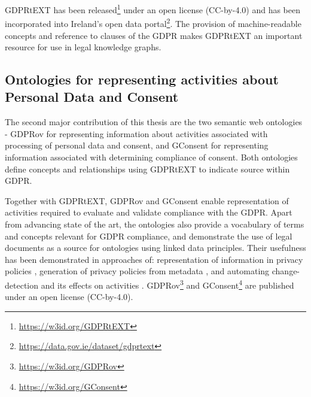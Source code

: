 GDPRtEXT has been released\footnote{\url{https://w3id.org/GDPRtEXT}} under an open license (CC-by-4.0) and has been incorporated into Ireland's open data portal\footnote{\url{https://data.gov.ie/dataset/gdprtext}}.
The provision of machine-readable concepts and reference to clauses of the GDPR makes GDPRtEXT an important resource for use in legal knowledge graphs.

\subsection{Ontologies for representing activities about Personal Data and Consent}\label{sec:contributions:ontologies}
The second major contribution of this thesis are the two semantic web ontologies - GDPRov for representing information about activities associated with processing of personal data and consent, and GConsent for representing information associated with determining compliance of consent. Both ontologies define concepts and relationships using GDPRtEXT to indicate source within GDPR.

Together with GDPRtEXT, GDPRov and GConsent enable representation of activities required to evaluate and validate compliance with the GDPR. Apart from advancing state of the art, the ontologies also provide a vocabulary of terms and concepts relevant for GDPR compliance, and demonstrate the use of legal documents as a source for ontologies using linked data principles.
Their usefulness has been demonstrated in approaches of: representation of information in privacy policies \cite{pandit_ontology_2018}, generation of privacy policies from metadata \cite{pandit_personalised_2018}, and automating change-detection and its effects on activities \cite{pandit_gdpr-driven_2018}.
GDPRov\footnote{\url{https://w3id.org/GDPRov}} and GConsent\footnote{\url{https://w3id.org/GConsent}} are published under an open license (CC-by-4.0).

